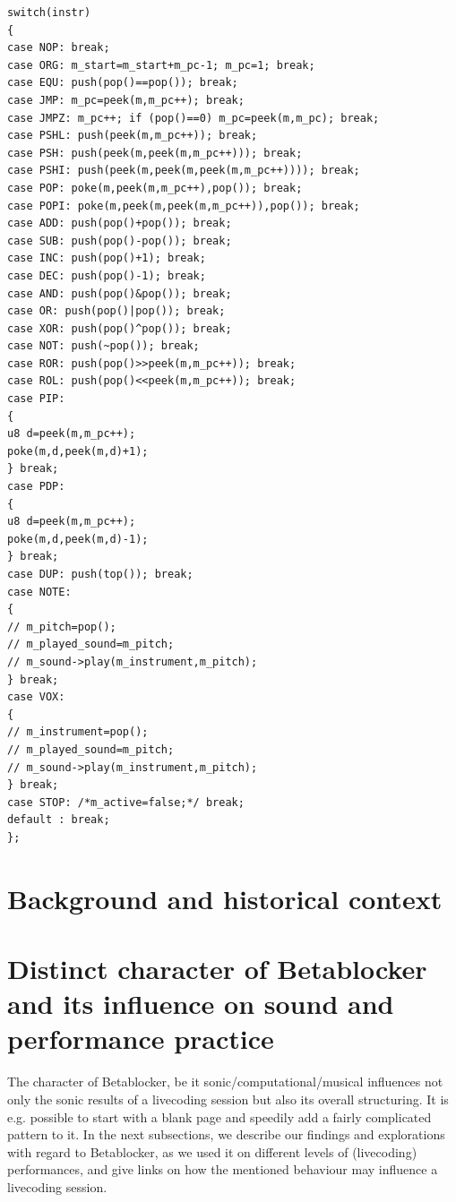 \documentclass[letterpaper, 12pt]{article}
\begin{document}
\begin{Verbatim}[fontfamily=courier, xleftmargin=\parindent]
switch(instr)
{
case NOP: break;
case ORG: m_start=m_start+m_pc-1; m_pc=1; break;
case EQU: push(pop()==pop()); break;
case JMP: m_pc=peek(m,m_pc++); break;
case JMPZ: m_pc++; if (pop()==0) m_pc=peek(m,m_pc); break;
case PSHL: push(peek(m,m_pc++)); break;
case PSH: push(peek(m,peek(m,m_pc++))); break;
case PSHI: push(peek(m,peek(m,peek(m,m_pc++)))); break;
case POP: poke(m,peek(m,m_pc++),pop()); break;
case POPI: poke(m,peek(m,peek(m,m_pc++)),pop()); break;
case ADD: push(pop()+pop()); break;
case SUB: push(pop()-pop()); break;
case INC: push(pop()+1); break;
case DEC: push(pop()-1); break;
case AND: push(pop()&pop()); break;
case OR: push(pop()|pop()); break;
case XOR: push(pop()^pop()); break;
case NOT: push(~pop()); break;
case ROR: push(pop()>>peek(m,m_pc++)); break;
case ROL: push(pop()<<peek(m,m_pc++)); break;
case PIP:
{
u8 d=peek(m,m_pc++);
poke(m,d,peek(m,d)+1);
} break;
case PDP:
{
u8 d=peek(m,m_pc++);
poke(m,d,peek(m,d)-1);
} break;
case DUP: push(top()); break;
case NOTE:
{
// m_pitch=pop();
// m_played_sound=m_pitch;
// m_sound->play(m_instrument,m_pitch);
} break;
case VOX:
{
// m_instrument=pop();
// m_played_sound=m_pitch;
// m_sound->play(m_instrument,m_pitch);
} break;
case STOP: /*m_active=false;*/ break;
default : break;
};
\end{Verbatim}


\section{Background and historical context} 
\label{sec:background}




\section{Distinct character of Betablocker and its influence on sound and performance practice} 
\label{sec:distinct_character}


The character of Betablocker, be it sonic/computational/musical influences not only the sonic results of a livecoding session but also its overall structuring. 
It is e.g. possible to start with a blank page and speedily add a fairly complicated pattern to it.
In the next subsections, we describe our findings and explorations with regard to Betablocker, as we used it on different levels of (livecoding) performances, and give links on how the mentioned behaviour may influence a livecoding session.
\end{document}
